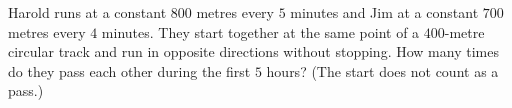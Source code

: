 Harold runs at a constant $800$ metres every $5$ minutes and Jim at a constant $700$ metres every $4$ minutes. They start together at the same point of a $400$-metre circular track and run in opposite directions without stopping. How many times do they pass each other during the first $5$ hours? (The start does not count as a pass.)
